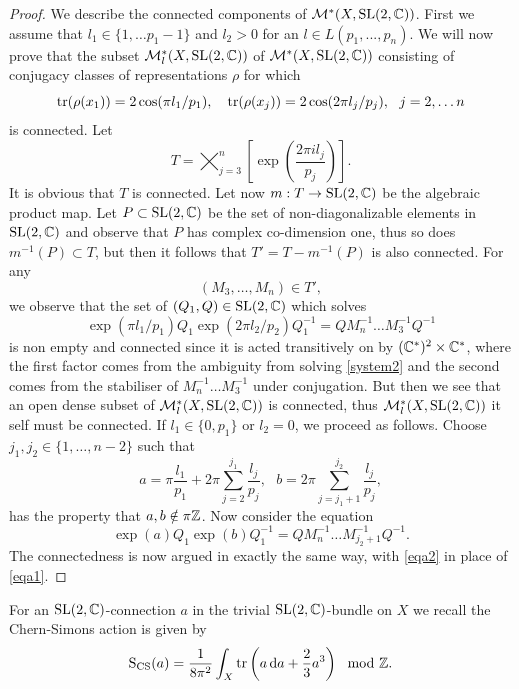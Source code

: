 \begin{proof}
 
 We describe the connected components of $\mathcal{M}^*(X,\operatorname{SL}(2,\mathbb{C}))$. First we assume that $l_1 \in \{1, \ldots p_1-1\}$ and $l_2 >0$ for an $l\in L(p_1,...,p_n) $. We will now prove that the subset $\mathcal{M}_l^*(X,\operatorname{SL}(2,\mathbb{C}))$ of $\mathcal{M}^*(X,\operatorname{SL}(2,\mathbb{C}))$ consisting of conjugacy classes of representations $\rho$ for which 
 $$ \operatorname{tr}(\rho(x_1)) = 2\cos(\pi l_1/p_1), \ \ \ \operatorname{tr}(\rho(x_j)) = 2\cos(2\pi l_j/p_j), \ \ j = 2, \ldots n$$
 is connected.
 Let 
 \begin{equation}
T  =    \bigtimes_{j=3}^{n} \left[\exp\left(\frac{2\pi il_j}{p_j}\right)\right].
\end{equation}
 It is obvious that $T$ is connected.  Let now $m : T \rightarrow \operatorname{SL}(2,\mathbb{C})$ be the algebraic product map. Let $P\subset \operatorname{SL}(2,\mathbb{C})$ be the set of non-diagonalizable elements in $\operatorname{SL}(2,\mathbb{C})$ and observe that $P$ has complex co-dimension one, thus so does $m^{-1}(P) \subset T$, but then it follows that $T' = T- m^{-1}(P)$ is also connected. For any
 $$(M_3, \ldots, M_n) \in T',$$
 we observe that the set of $(Q_1,Q)\in \operatorname{SL}(2,\mathbb{C})$ which solves
 \begin{equation}\label{eqa1}
 \exp(\pi l_1/p_1) Q_1 \exp(2 \pi  l_2/p_2) Q_1^{-1} = Q M_n^{-1} \ldots M_3^{-1} Q^{-1}
 \end{equation}
 is non empty and connected since it is acted transitively on by $(\mathbb{C}^*)^2 \times \mathbb{C}^*$, where the first factor comes from the ambiguity from solving \eqref{system2} and the second comes from the stabiliser of $M_n^{-1} \ldots M_3^{-1}$ under conjugation. But then we see that an open dense subset of $\mathcal{M}_l^*(X,\operatorname{SL}(2,\mathbb{C}))$ is connected, thus $\mathcal{M}_l^*(X,\operatorname{SL}(2,\mathbb{C}))$ it self must be connected.
If $l_1\in \{0,p_1\}$ or $l_2 =0$, we proceed as follows. Choose $j_1, j_2 \in \{1,\ldots, n-2\}$ such that
$$ a = \pi \frac{l_1}{p_1} + 2\pi \sum_{j=2}^{j_1} \frac{l_j}{p_j}, \ \ \ b = 2\pi \sum_{j=j_1+1}^{j_2} \frac{l_j}{p_j},$$
has the property that $a,b\notin \pi \mathbb{Z}$. Now consider the equation
\begin{equation}\label{eqa2}
\exp(a) Q_1 \exp(b) Q_1^{-1} = Q M_n^{-1} \ldots M_{j_2+1}^{-1} Q^{-1}.
\end{equation}
The connectedness is now argued in exactly the same way, with \eqref{eqa2} in place of \eqref{eqa1}.
 \end{proof}

For an $\operatorname{SL}(2,\mathbb{C})$-connection $a$ in the trivial $\operatorname{SL}(2,\mathbb{C})$-bundle on $X$ we recall the Chern-Simons action is given by 
\begin{equation} \label{eq:CSaction} \operatorname{S_{CS}}(a)=\frac{1}{8\pi^2 }\int_X \operatorname{tr}\left(a\operatorname{{d}\hskip-.6mm} a +\frac{2}{3}a^3\right) \mod {\mathbb{Z}}.
\end{equation} 

